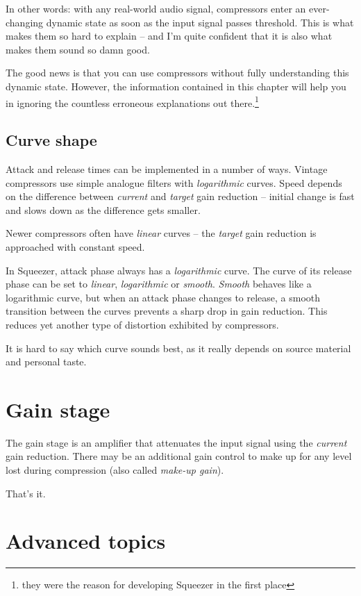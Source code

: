 In other words: with any real-world audio signal, compressors enter an
ever-changing dynamic state as soon as the input signal passes
threshold.  This is what makes them so hard to explain -- and I'm
quite confident that it is also what makes them sound so damn good.

The good news is that you can use compressors without fully
understanding this dynamic state.  However, the information contained
in this chapter will help you in ignoring the countless erroneous
explanations out there.\footnote{they were the reason for developing
  Squeezer in the first place}

\subsection{Curve shape}
\label{sec:curve_shape}

Attack and release times can be implemented in a number of ways.
Vintage compressors use simple analogue filters with
\emph{logarithmic} curves.  Speed depends on the difference between
\emph{current} and \emph{target} gain reduction -- initial change is
fast and slows down as the difference gets smaller.

Newer compressors often have \emph{linear} curves -- the \emph{target}
gain reduction is approached with constant speed.

In Squeezer, attack phase always has a \emph{logarithmic} curve.  The
curve of its release phase can be set to \emph{linear},
\emph{logarithmic} or \emph{smooth}.  \emph{Smooth} behaves like a
logarithmic curve, but when an attack phase changes to release, a
smooth transition between the curves prevents a sharp drop in gain
reduction.  This reduces yet another type of distortion exhibited by
compressors.

It is hard to say which curve sounds best, as it really depends on
source material and personal taste.

\section{Gain stage}
\label{sec:gain_stage}

The gain stage is an amplifier that attenuates the input signal using
the \emph{current} gain reduction.  There may be an additional gain
control to make up for any level lost during compression (also called
\emph{make-up gain}).

That's it.

\section{Advanced topics}
\label{sec:advanced_topics}

